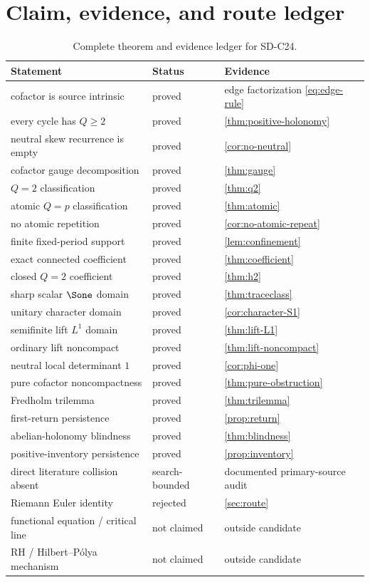 \section{Claim, evidence, and route ledger}
\label{app:scope}

\begin{table}[h]
\centering
\scriptsize
\caption{Complete theorem and evidence ledger for SD-C24.}
\label{tab:claim-ledger}
\begin{tabularx}{\textwidth}{L{0.28\textwidth}L{0.20\textwidth}Y}
\toprule
Statement & Status & Evidence \\
\midrule
cofactor is source intrinsic & proved & edge factorization \cref{eq:edge-rule} \\
every cycle has \(Q\ge2\) & proved & \cref{thm:positive-holonomy} \\
neutral skew recurrence is empty & proved & \cref{cor:no-neutral} \\
cofactor gauge decomposition & proved & \cref{thm:gauge} \\
\(Q=2\) classification & proved & \cref{thm:q2} \\
atomic \(Q=p\) classification & proved & \cref{thm:atomic} \\
no atomic repetition & proved & \cref{cor:no-atomic-repeat} \\
finite fixed-period support & proved & \cref{lem:confinement} \\
exact connected coefficient & proved & \cref{thm:coefficient} \\
closed \(Q=2\) coefficient & proved & \cref{thm:h2} \\
sharp scalar \(\Sone\) domain & proved & \cref{thm:traceclass} \\
unitary character domain & proved & \cref{cor:character-S1} \\
semifinite lift \(L^1\) domain & proved & \cref{thm:lift-L1} \\
ordinary lift noncompact & proved & \cref{thm:lift-noncompact} \\
neutral local determinant \(1\) & proved & \cref{cor:phi-one} \\
pure cofactor noncompactness & proved & \cref{thm:pure-obstruction} \\
Fredholm trilemma & proved & \cref{thm:trilemma} \\
first-return persistence & proved & \cref{prop:return} \\
abelian-holonomy blindness & proved & \cref{thm:blindness} \\
positive-inventory persistence & proved & \cref{prop:inventory} \\
direct literature collision absent & search-bounded & documented primary-source audit \\
Riemann Euler identity & rejected & \cref{sec:route} \\
functional equation / critical line & not claimed & outside candidate \\
RH / Hilbert--Pólya mechanism & not claimed & outside candidate \\
\bottomrule
\end{tabularx}
\end{table}

